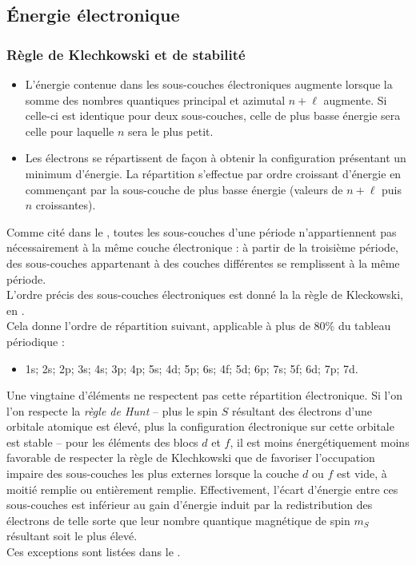 \pagebreak

\pagebreak



\subsection{\'Energie électronique}

\subsubsection{Règle de Klechkowski et de stabilité}
\begin{itemize}
	\item L'énergie contenue dans les sous-couches électroniques augmente lorsque la somme des nombres quantiques principal et azimutal $n + \ell$ augmente. Si celle-ci est identique pour deux sous-couches, celle de plus basse énergie sera celle pour laquelle $n$ sera le plus petit.
	\item Les électrons se répartissent de façon à obtenir la configuration présentant un minimum d'énergie. La répartition s'effectue par ordre croissant d'énergie en commençant par la sous-couche de plus basse énergie (valeurs de $n + \ell$ puis $n$ croissantes).
\end{itemize}

Comme cité dans le , toutes les sous-couches d'une période n'appartiennent pas nécessairement à la même couche électronique : à partir de la troisième période, des sous-couches appartenant à des couches différentes se remplissent à la même période.\\L'ordre précis des sous-couches électroniques est donné la la règle de Kleckowski, en .\\
Cela donne l'ordre de répartition suivant, applicable à plus de 80\% du tableau périodique : 
\begin{itemize}
	\item 1s; 2s; 2p; 3s; 4s; 3p; 4p; 5s; 4d; 5p; 6s; 4f; 5d; 6p; 7s; 5f; 6d; 7p; 7d.
\end{itemize}



Une vingtaine d'éléments ne respectent pas cette répartition électronique. Si l'on l'on respecte la \emph{règle de Hunt} -- plus le spin $S$ résultant des électrons d'une orbitale atomique est élevé, plus la configuration électronique sur cette orbitale est stable -- pour les éléments des blocs $d$ et $f$, il est moins énergétiquement moins favorable de respecter la règle de Klechkowski que de favoriser l'occupation impaire des sous-couches les plus externes lorsque la couche $d$ ou $f$ est vide, à moitié remplie ou entièrement remplie. Effectivement, l'écart d'énergie entre ces sous-couches est inférieur au gain d'énergie induit par la redistribution des électrons de telle sorte que leur nombre quantique magnétique de spin $m_S$ résultant soit le plus élevé.\\
Ces \og exceptions \fg{} sont listées dans le .

